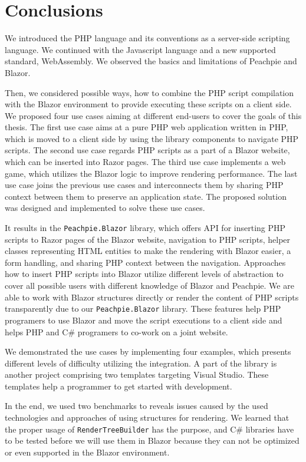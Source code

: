\chapter{Conclusions}

We introduced the PHP language and its conventions as a server-side scripting language.
We continued with the Javascript language and a new supported standard, WebAssembly.
We observed the basics and limitations of Peachpie and Blazor.
\par
Then, we considered possible ways, how to combine the PHP script compilation with the Blazor environment to provide executing these scripts on a client side.
We proposed four use cases aiming at different end-users to cover the goals of this thesis.
The first use case aims at a pure PHP web application written in PHP, which is moved to a client side by using the library components to navigate PHP scripts.
The second use case regards PHP scripts as a part of a Blazor website, which can be inserted into Razor pages.
The third use case implements a web game, which utilizes the Blazor logic to improve rendering performance.
The last use case joins the previous use cases and interconnects them by sharing PHP context between them to preserve an application state.  
The proposed solution was designed and implemented to solve these use cases.
\par
It results in the \texttt{Peachpie.Blazor} library, which offers API for inserting PHP scripts to Razor pages of the Blazor website, navigation to PHP scripts, helper classes representing HTML entities to make the rendering with Blazor easier, a form handling, and sharing PHP context between the navigation.
Approaches how to insert PHP scripts into Blazor utilize different levels of abstraction to cover all possible users with different knowledge of Blazor and Peachpie.
We are able to work with Blazor structures directly or render the content of PHP scripts transparently due to our \texttt{Peachpie.Blazor} library.
These features help PHP programers to use Blazor and move the script executions to a client side and helps PHP and C\# programers to co-work on a joint website.
\par
We demonstrated the use cases by implementing four examples, which presents different levels of difficulty utilizing the integration.
A part of the library is another project comprising two templates targeting Visual Studio.
These templates help a programmer to get started with development.
\par
In the end, we used two benchmarks to reveals issues caused by the used technologies and approaches of using structures for rendering.
We learned that the proper usage of \texttt{RenderTreeBuilder} has the purpose, and C\# libraries have to be tested before we will use them in Blazor because they can not be optimized or even supported in the Blazor environment.

